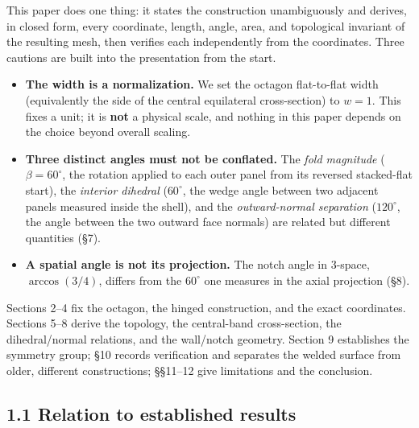 \documentclass[
  11pt,
  a4paper,
]{article}
\providecommand{\tightlist}{%
  \setlength{\itemsep}{0pt}\setlength{\parskip}{0pt}}
\begin{document}
This paper does one thing: it states the construction unambiguously and derives, in closed form, every coordinate, length, angle, area, and topological invariant of the resulting mesh, then verifies each independently from the coordinates. Three cautions are built into the presentation from the start.

\begin{itemize}
\tightlist
\item
  \textbf{The width is a normalization.} We set the octagon flat-to-flat width (equivalently the side of the central equilateral cross-section) to \(w=1\). This fixes a unit; it is \textbf{not} a physical scale, and nothing in this paper depends on the choice beyond overall scaling.
\item
  \textbf{Three distinct angles must not be conflated.} The \emph{fold magnitude} (\(\beta=60^\circ\), the rotation applied to each outer panel from its reversed stacked-flat start), the \emph{interior dihedral} (\(60^\circ\), the wedge angle between two adjacent panels measured inside the shell), and the \emph{outward-normal separation} (\(120^\circ\), the angle between the two outward face normals) are related but different quantities (§7).
\item
  \textbf{A spatial angle is not its projection.} The notch angle in \(3\)-space, \(\arccos(3/4)\), differs from the \(60^\circ\) one measures in the axial projection (§8).
\end{itemize}

Sections 2--4 fix the octagon, the hinged construction, and the exact coordinates. Sections 5--8 derive the topology, the central-band cross-section, the dihedral/normal relations, and the wall/notch geometry. Section 9 establishes the symmetry group; §10 records verification and separates the welded surface from older, different constructions; §§11--12 give limitations and the conclusion.

\subsection{1.1 Relation to established results}\label{relation-to-established-results}
\end{document}
